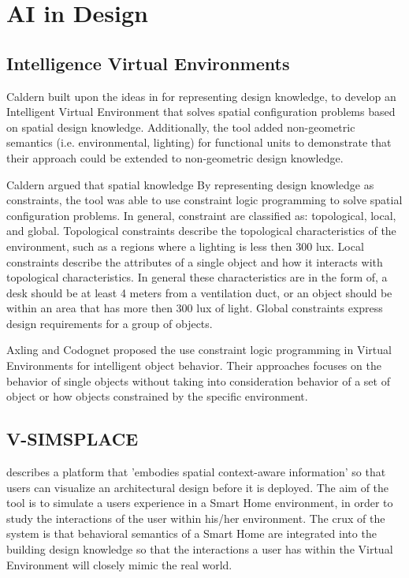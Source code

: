 \documentclass[12pt]{ucthesis}
\begin{document}
\section{AI in Design}
\subsection{Intelligence Virtual Environments}
Caldern \cite{CalderónCLP06} built upon the ideas in \cite{FlemmingIKM94} for representing design knowledge, to develop an Intelligent Virtual Environment that solves spatial configuration problems based on spatial design knowledge. Additionally, the tool added non-geometric semantics (i.e. environmental, lighting) for functional units to demonstrate that their approach could be extended to non-geometric design knowledge.

Caldern argued that spatial knowledge By representing design knowledge as constraints, the tool was able to use constraint logic programming to solve spatial configuration problems. In general, constraint are classified as: topological, local, and global. Topological constraints describe the topological characteristics of the environment, such as a regions where a lighting is less then 300 lux. Local constraints describe the attributes of a
single object and how it interacts with topological characteristics. In general these characteristics are in the form of, a desk should be at least 4 meters from a ventilation duct, or an object should be within an area that has more then 300 lux of light. Global constraints express design requirements for a group of objects.  

Axling \cite{AxlingEURO96} and Codognet \cite{CodognetDMS99} proposed the use constraint  logic programming in Virtual Environments for intelligent object behavior. Their approaches focuses on the behavior of single objects without taking into consideration behavior of a set of object or how objects constrained by the specific environment. 

\subsection{V-SIMSPLACE}
\cite{LertlakkhanakulIBPSA06} describes a platform that 'embodies spatial context-aware information' so that users can visualize an architectural design before it is deployed. The aim of the tool is to simulate a users experience in a Smart Home environment, in order to study the interactions of the user within his/her environment. The crux of the system is that behavioral semantics of a Smart Home are integrated into the building design knowledge so that the interactions a user has within the Virtual Environment will closely mimic the real world.
\end{document}
